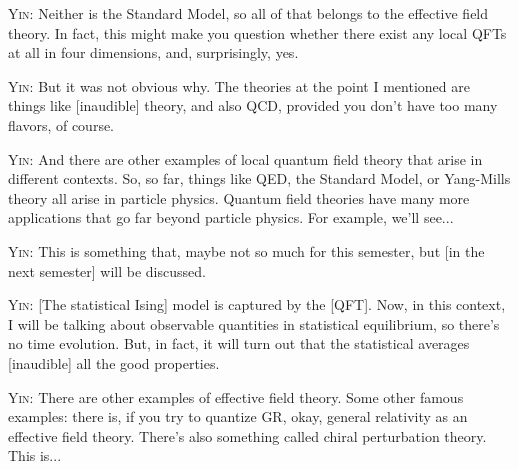 

\noindent\textsc{Yin:} Neither is the Standard Model, so all of that belongs to the effective field theory. In fact, this might make you question whether there exist any local QFTs at all in four dimensions, and, surprisingly, yes.\par

\noindent\textsc{Yin:} But it was not obvious why. The theories at the point I mentioned are things like [inaudible] theory, and also QCD, provided you don't have too many flavors, of course.\par

\noindent\textsc{Yin:} And there are other examples of local quantum field theory that arise in different contexts. So, so far, things like QED, the Standard Model, or Yang-Mills theory all arise in particle physics. Quantum field theories have many more applications that go far beyond particle physics. For example, we'll see...\par

\noindent\textsc{Yin:} This is something that, maybe not so much for this semester, but [in the next semester] will be discussed.\par

\noindent\textsc{Yin:} [The statistical Ising] model is captured by the [QFT]. Now, in this context, I will be talking about observable quantities in statistical equilibrium, so there's no time evolution. But, in fact, it will turn out that the statistical averages [inaudible] all the good properties.\par

\noindent\textsc{Yin:} There are other examples of effective field theory. Some other famous examples: there is, if you try to quantize GR, okay, general relativity as an effective field theory. There's also something called chiral perturbation theory. This is...\par

